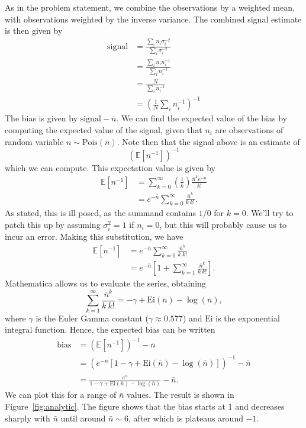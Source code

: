 \documentclass{article}
\begin{document}
As in the problem statement, we combine the observations by a weighted mean,
with observations weighted by the inverse variance. The combined signal
estimate is then given by
\begin{align}
	\text{signal}
	&= \frac{\sum_i n_i \sigma_i^{-2}}{\sum_i \sigma_i^{-2}} \\
	&= \frac{\sum_i n_i n_i^{-1}}{\sum_i n_i^{-1}} \\
	&= \frac{N}{\sum_i n_i^{-1}} \\
	&= \left( \frac{1}{N} \sum_i n_i^{-1} \right)^{-1}
\end{align}
The bias is given by $\text{signal} - \bar n$. We can find the expected value
of the bias by computing the expected value of the signal, given that $n_i$ are
observations of random variable $n \sim \text{Pois}(\bar n)$. Note then that
the signal above is an estimate of
\begin{equation}
	\left( \mathbb{E}[n^{-1}] \right)^{-1}
\end{equation}
which we can compute. This expectation value is given by
\begin{align}
	\mathbb{E}[n^{-1}]
	&= \sum_{k=0}^{\infty} \left(\frac{1}{k}\right) \frac{\bar{n}^k e^{-\bar{n}}}{k!} \\
	&= e^{-\bar{n}} \sum_{k=0}^{\infty} \frac{\bar{n}^k}{k \ k!}.
\end{align}
As stated, this is ill posed, as the summand contains $1 / 0$ for $k = 0$. We'll try
to patch this up by assuming $\sigma_i^2 = 1$ if $n_i = 0$, but this will probably
cause us to incur an error. Making this substitution, we have
\begin{align}
	\mathbb{E}[n^{-1}]
	&= e^{-\bar{n}} \sum_{k=0}^{\infty} \frac{\bar{n}^k}{k \ k!} \\
	&= e^{-\bar{n}} \left[1 + \sum_{k=1}^{\infty} \frac{\bar{n}^k}{k \ k!}\right].
\end{align}
Mathematica allows us to evaluate the series, obtaining
\begin{equation}
	\sum_{k=1}^{\infty} \frac{\bar{n}^k}{k \ k!}
	=
	-\gamma + \text{Ei}(\bar n) - \log (\bar n),
\end{equation}
where $\gamma$ is the Euler Gamma constant ($\gamma \approx 0.577$) and
$\text{Ei}$ is the exponential integral function.
Hence, the expected bias can be written
\begin{align}
	\text{bias}
	&= \left( \mathbb{E}[n^{-1}] \right)^{-1} - \bar n \\
	&= \left( e^{-\bar{n}} \left[1 - \gamma + \text{Ei}(\bar n) - \log (\bar n)\right] \right)^{-1} - \bar n \\
	&= \frac{e^{\bar{n}}}{1 - \gamma + \text{Ei}(\bar n) - \log (\bar n)} - \bar n.
\end{align}
We can plot this for a range of $\bar n$ values. The result is shown in
Figure~\ref{fig:analytic}. The figure shows that the bias starts at 1 and
decreases sharply with $\bar n$ until around $\bar n \sim 6$, after which is
plateaus around $-1$.
\end{document}
